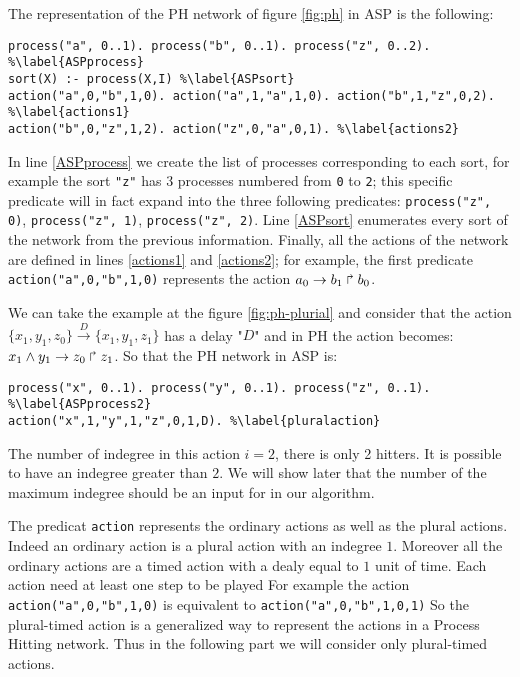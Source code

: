 \begin{example}
\label{ex1:asp-ph}
The representation of the PH network of figure \ref{fig:ph} in ASP is the following:
\begin{lstlisting}
process("a", 0..1). process("b", 0..1). process("z", 0..2). %\label{ASPprocess}
sort(X) :- process(X,I) %\label{ASPsort}
action("a",0,"b",1,0). action("a",1,"a",1,0). action("b",1,"z",0,2). %\label{actions1}
action("b",0,"z",1,2). action("z",0,"a",0,1). %\label{actions2}
\end{lstlisting}
In line \ref{ASPprocess} we create the list of processes corresponding to each sort,
for example the sort \texttt{"z"} has 3 processes numbered from \texttt{0} to \texttt{2};
this specific predicate will in fact expand into the three following predicates:
\texttt{process("z", 0)}, \texttt{process("z", 1)}, \texttt{process("z", 2)}.
Line \ref{ASPsort} enumerates every sort of the network from the previous information.
Finally, all the actions of the network are defined in lines \ref{actions1} and \ref{actions2};
for example, the first predicate \texttt{action("a",0,"b",1,0)} represents the action
$a_0\rightarrow b_1\Rsh b_0$.
\end{example}

\begin{example}
\label{ex2:ph-asp}
We can take the example at the figure \ref{fig:ph-plurial} and consider that the action  $\{x_1, y_1, z_0 \} \xrightarrow{D} \{x_1, y_1, z_1 \} $  has a delay "$D$" and in PH the action becomes: $x_1 \wedge y_1\rightarrow z_0\Rsh z_1$. So that the PH  network in ASP is:
\begin{lstlisting}
process("x", 0..1). process("y", 0..1). process("z", 0..1). %\label{ASPprocess2}
action("x",1,"y",1,"z",0,1,D). %\label{pluralaction}
\end{lstlisting}
The number of indegree in this action $i=2$, there is only 2 hitters. It is possible to have an indegree greater than $2$. We will show later that the number of the maximum indegree should be an input for in our algorithm.
\end{example}

The predicat \texttt{action} represents the ordinary actions as well as the plural actions. Indeed an ordinary action is a plural action with an indegree $1$. Moreover all the ordinary actions are a timed action with a dealy equal to $1$ unit of time. Each action need at least one step to be played  For example the action \texttt{action("a",0,"b",1,0)} is equivalent to \texttt{action("a",0,"b",1,0,1)}
So the plural-timed action is a generalized way to represent the actions in a Process Hitting network. Thus in the following part we will consider only plural-timed actions. 
	